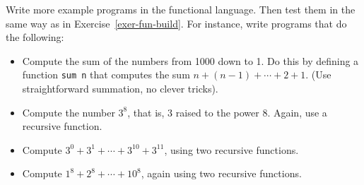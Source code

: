 \documentclass[a4paper]{article}
\begin{document}
\begin{exercise}\label{exer-fun-more-examples}
  Write more example programs in the functional language.  Then test
  them in the same way as in Exercise~\ref{exer-fun-build}\@.  For
  instance, write programs that do the following:

  \begin{itemize}
  \item Compute the sum of the numbers from 1000 down to 1.  Do this
    by defining a function \texttt{sum n} that computes the sum
    $n+(n-1)+\cdots + 2 + 1$.  (Use straightforward summation, no
    clever tricks).

  \item Compute the number $3^8$, that is, 3 raised to the power 8.
    Again, use a recursive function.

  \item Compute $3^0 + 3^1 + \cdots + 3^{10} + 3^{11}$, using two
    recursive functions.

  \item Compute $1^8 + 2^8 + \cdots + 10^8$, again using two recursive
    functions.
  \end{itemize}
\end{exercise}
\end{document}
